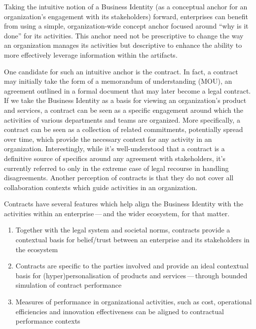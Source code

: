 Taking the intuitive notion of a Business Identity (as a conceptual anchor for an organization’s engagement with
its stakeholders) forward, enterprises can benefit from using a simple, organization-wide concept anchor
focused around “why is it done” for its activities.
This anchor need not be prescriptive to change the way an organization manages its activities but descriptive to
enhance the ability to more effectively leverage information within the artifacts.

One candidate for such an intuitive anchor is the contract.
In fact, a contract may initially take the form of a memorandum of understanding (MOU), an agreement outlined in a
formal document that may later become a legal contract.
If we take the Business Identity as a basis for viewing an organization’s product and services,
a contract can be seen as a specific engagement around which the activities of various departments and teams are
organized.
More specifically, a contract can be seen as a collection of related commitments, potentially spread over time,
which provide the necessary context for any activity in an organization.
Interestingly, while it's well-understood that a contract is a definitive source of specifics around any
agreement with stakeholders, it's currently referred to only in the extreme case of legal recourse in
handling disagreements.
Another perception of contracts is that they do not cover all collaboration contexts which guide activities
in an organization.

Contracts have several features which help align the Business Identity with the activities
within an enterprise\,---\,and the wider ecosystem, for that matter.

\begin{enumerate}[label=\alph*]
    \item Together with the legal system and societal norms, contracts provide a contextual basis for
          belief/trust between an enterprise and its stakeholders in the ecosystem
    \item Contracts are specific to the parties involved and provide an ideal contextual basis for
          (hyper)personalisation of products and services\,---\,through bounded simulation of contract performance
    \item Measures of performance in organizational activities, such as cost, operational efficiencies and
          innovation effectiveness can be aligned to contractual performance contexts
\end{enumerate}

